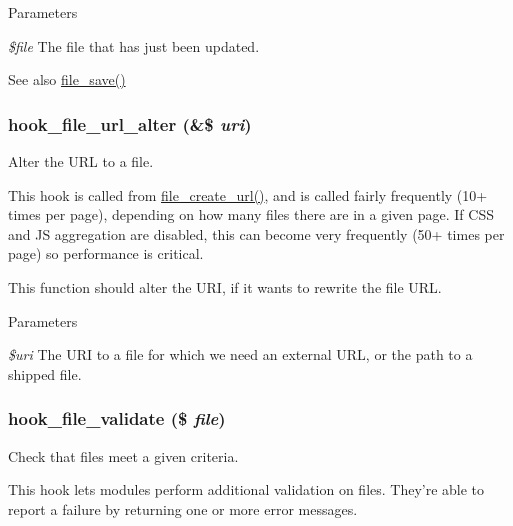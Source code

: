 \begin{DoxyParams}{Parameters}
\item[{\em \$file}]The file that has just been updated.\end{DoxyParams}
\begin{DoxySeeAlso}{See also}
\hyperlink{group__file_ga80327cb23d8d384b827b2637cd8cc4ba}{file\_\-save()} 
\end{DoxySeeAlso}
\hypertarget{group__hooks_ga996bb014bd4944c0e468c1525768a96c}{
\subsubsection[{hook\_\-file\_\-url\_\-alter}]{\setlength{\rightskip}{0pt plus 5cm}hook\_\-file\_\-url\_\-alter (\&\$ {\em uri})}}
\label{group__hooks_ga996bb014bd4944c0e468c1525768a96c}
Alter the URL to a file.

This hook is called from \hyperlink{group__file_gaee57f47d60bda90961a2e19d580d4908}{file\_\-create\_\-url()}, and is called fairly frequently (10+ times per page), depending on how many files there are in a given page. If CSS and JS aggregation are disabled, this can become very frequently (50+ times per page) so performance is critical.

This function should alter the URI, if it wants to rewrite the file URL.


\begin{DoxyParams}{Parameters}
\item[{\em \$uri}]The URI to a file for which we need an external URL, or the path to a shipped file. \end{DoxyParams}
\hypertarget{group__hooks_gab1491b52a117229913448d787156e013}{
\subsubsection[{hook\_\-file\_\-validate}]{\setlength{\rightskip}{0pt plus 5cm}hook\_\-file\_\-validate (\$ {\em file})}}
\label{group__hooks_gab1491b52a117229913448d787156e013}
Check that files meet a given criteria.

This hook lets modules perform additional validation on files. They're able to report a failure by returning one or more error messages.


